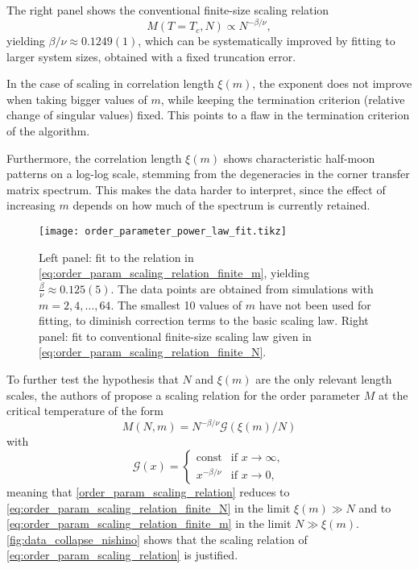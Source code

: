 The right panel shows the conventional finite-size scaling relation
\begin{equation}\label{eq:order_param_scaling_relation_finite_N}
  M(T = T_c, N) \propto N^{-\beta/\nu},
\end{equation}
yielding $\beta/\nu \approx 0.1249(1)$, which can be systematically improved by
fitting to larger system sizes, obtained with a fixed truncation error.

In the case of scaling in correlation length $\xi(m)$, the exponent does not improve when
taking bigger values of $m$, while keeping the termination criterion (relative change of
singular values) fixed. This points to a flaw in the termination criterion of the
algorithm.

Furthermore, the correlation length $\xi(m)$ shows characteristic half-moon patterns on a
log-log scale, stemming from the degeneracies in the corner transfer matrix spectrum. This
makes the data harder to interpret, since the effect of increasing $m$ depends on how much
of the spectrum is currently retained.


\begin{figure}
  \texttt{[image: order\_parameter\_power\_law\_fit.tikz]}
  \caption{Left panel: fit to the relation in
  \autoref{eq:order_param_scaling_relation_finite_m}, yielding $\frac{\beta}{\nu} \approx
  0.125(5)$. The data points are obtained from simulations with $m = 2, 4, \dots, 64$. The
  smallest 10 values of $m$ have not been used for fitting, to diminish correction terms
  to the basic scaling law. Right panel: fit to conventional finite-size scaling law
  given in \autoref{eq:order_param_scaling_relation_finite_N}.
  }
  \label{fig:order_parameter_power_law_fit}
\end{figure}

To further test the hypothesis that $N$ and $\xi(m)$ are the only relevant length scales,
the authors of \cite{nishino1996numerical} propose a scaling relation for the order
parameter $M$ at the critical temperature of the form
\begin{equation}\label{eq:order_param_scaling_relation}
  M(N, m) = N^{-\beta/\nu} \mathcal{G}(\xi(m) / N)
\end{equation}
with
\begin{equation}
  \mathcal{G}(x) =
  \begin{cases}
    \text{const} & \text{if } x \to \infty, \\
    x^{-\beta/\nu} & \text{if } x \to 0,
  \end{cases}
\end{equation}
meaning that \autoref{order_param_scaling_relation} reduces to
\autoref{eq:order_param_scaling_relation_finite_N} in the limit $\xi(m) \gg N$ and to
\autoref{eq:order_param_scaling_relation_finite_m} in the limit $N \gg \xi(m)$.
\autoref{fig:data_collapse_nishino} shows that the scaling relation of \autoref{eq:order_param_scaling_relation}
is justified.

